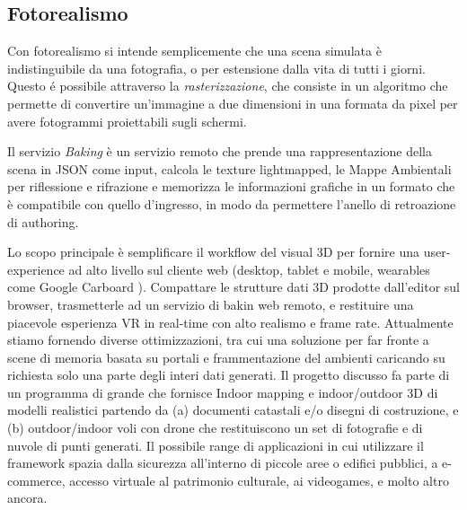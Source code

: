 \subsection{Fotorealismo}
\label{sec:conclusions_section_2_sub_3}
Con fotorealismo si intende semplicemente che una scena simulata \`e indistinguibile da una fotografia, o per estensione
dalla vita di tutti i giorni. Questo \'e possibile attraverso la \emph{rasterizzazione}, che consiste in un algoritmo che
permette di convertire un'immagine a due dimensioni in una formata da pixel per avere fotogrammi proiettabili sugli schermi.

Il servizio \emph{Baking} \`e un servizio remoto che prende una rappresentazione della scena in JSON come input,
calcola le texture lightmapped, le Mappe Ambientali per riflessione e rifrazione e memorizza le informazioni grafiche
in un formato che \`e compatibile con quello d'ingresso, in modo da permettere l'anello di retroazione di authoring.


Lo scopo principale \`e semplificare il workflow del visual 3D per fornire una user-experience ad alto livello
sul cliente web (desktop, tablet e mobile, wearables come Google Carboard ).
Compattare le strutture dati 3D prodotte dall'editor sul browser, trasmetterle ad un servizio di bakin web remoto,
e restituire una piacevole esperienza VR in real-time con alto realismo e frame rate.
Attualmente stiamo fornendo diverse ottimizzazioni, tra cui una soluzione per far fronte a scene di memoria basata
 su portali e frammentazione del ambienti caricando su richiesta solo una parte degli interi dati generati.
Il progetto discusso fa parte di un programma di grande che fornisce Indoor mapping e indoor/outdoor 3D di modelli realistici
partendo da (a) documenti catastali e/o disegni di costruzione, e (b) outdoor/indoor voli con drone che restituiscono
un set di fotografie e di nuvole di punti generati.
Il possibile range di applicazioni in cui utilizzare il framework spazia dalla sicurezza all'interno di piccole aree o edifici pubblici, a e-commerce,
accesso virtuale al patrimonio culturale, ai videogames, e molto altro ancora.


